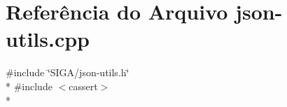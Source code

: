 \section{Referência do Arquivo json-\/utils.cpp}
\label{json-utils_8cpp}
{\ttfamily \#include \char`\"{}S\+I\+G\+A/json-\/utils.\+h\char`\"{}}\\*
{\ttfamily \#include $<$cassert$>$}\\*
